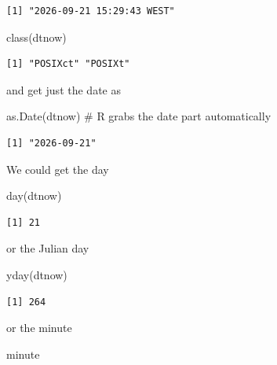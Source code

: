 \documentclass[
  letterpaper,
  DIV=11,
  numbers=noendperiod]{scrartcl}
\newenvironment{Shaded}{\begin{snugshade}}{\end{snugshade}}
\newcommand{\CommentTok}[1]{\textcolor[rgb]{0.37,0.37,0.37}{#1}}
\newcommand{\FunctionTok}[1]{\textcolor[rgb]{0.28,0.35,0.67}{#1}}
\newcommand{\NormalTok}[1]{\textcolor[rgb]{0.00,0.23,0.31}{#1}}
\begin{document}
\begin{verbatim}
[1] "2026-09-21 15:29:43 WEST"
\end{verbatim}

\begin{Shaded}
\begin{Highlighting}[]
\FunctionTok{class}\NormalTok{(dtnow)}
\end{Highlighting}
\end{Shaded}

\begin{verbatim}
[1] "POSIXct" "POSIXt" 
\end{verbatim}

and get just the date as

\begin{Shaded}
\begin{Highlighting}[]
\FunctionTok{as.Date}\NormalTok{(dtnow)  }\CommentTok{\# R grabs the date part automatically}
\end{Highlighting}
\end{Shaded}

\begin{verbatim}
[1] "2026-09-21"
\end{verbatim}

We could get the day

\begin{Shaded}
\begin{Highlighting}[]
\FunctionTok{day}\NormalTok{(dtnow)}
\end{Highlighting}
\end{Shaded}

\begin{verbatim}
[1] 21
\end{verbatim}

or the Julian day

\begin{Shaded}
\begin{Highlighting}[]
\FunctionTok{yday}\NormalTok{(dtnow)}
\end{Highlighting}
\end{Shaded}

\begin{verbatim}
[1] 264
\end{verbatim}

or the minute

\begin{Shaded}
\begin{Highlighting}[]
\NormalTok{minute}
\end{Highlighting}
\end{Shaded}
\end{document}
